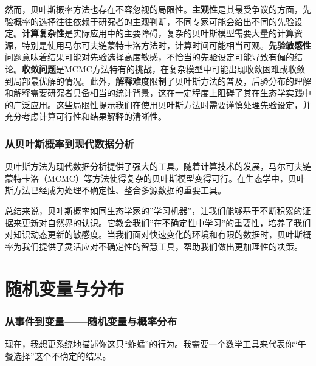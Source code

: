 \documentclass[
]{book}
\begin{document}
然而，贝叶斯概率方法也存在不容忽视的局限性。\textbf{主观性}是其最受争议的方面，先验概率的选择往往依赖于研究者的主观判断，不同专家可能会给出不同的先验设定。\textbf{计算复杂性}是实际应用中的主要障碍，复杂的贝叶斯模型需要大量的计算资源，特别是使用马尔可夫链蒙特卡洛方法时，计算时间可能相当可观。\textbf{先验敏感性}问题意味着结果可能对先验选择高度敏感，不恰当的先验设定可能导致有偏的结论。\textbf{收敛问题}是MCMC方法特有的挑战，在复杂模型中可能出现收敛困难或收敛到局部最优解的情况。此外，\textbf{解释难度}限制了贝叶斯方法的普及，后验分布的理解和解释需要研究者具备相当的统计背景，这在一定程度上阻碍了其在生态学实践中的广泛应用。这些局限性提示我们在使用贝叶斯方法时需要谨慎处理先验设定，并充分考虑计算可行性和结果解释的清晰性。

\hypertarget{ux4eceux8d1dux53f6ux65afux6982ux7387ux5230ux73b0ux4ee3ux6570ux636eux5206ux6790}{%
\subsubsection{从贝叶斯概率到现代数据分析}\label{ux4eceux8d1dux53f6ux65afux6982ux7387ux5230ux73b0ux4ee3ux6570ux636eux5206ux6790}}

贝叶斯方法为现代数据分析提供了强大的工具。随着计算技术的发展，马尔可夫链蒙特卡洛（MCMC）等方法使得复杂的贝叶斯模型变得可行。在生态学中，贝叶斯方法已经成为处理不确定性、整合多源数据的重要工具。

总结来说，贝叶斯概率如同生态学家的''学习机器''，让我们能够基于不断积累的证据来更新对自然界的认识。它教会我们''在不确定性中学习''的重要性，培养了我们对知识动态更新的敏感度。当我们面对快速变化的环境和有限的数据时，贝叶斯概率为我们提供了灵活应对不确定性的智慧工具，帮助我们做出更加理性的决策。

\hypertarget{ux968fux673aux53d8ux91cfux4e0eux5206ux5e03}{%
\section{随机变量与分布}\label{ux968fux673aux53d8ux91cfux4e0eux5206ux5e03}}

\hypertarget{ux4eceux4e8bux4ef6ux5230ux53d8ux91cfux968fux673aux53d8ux91cfux4e0eux6982ux7387ux5206ux5e03}{%
\subsubsection{从事件到变量------随机变量与概率分布}\label{ux4eceux4e8bux4ef6ux5230ux53d8ux91cfux968fux673aux53d8ux91cfux4e0eux6982ux7387ux5206ux5e03}}

现在，我想更系统地描述你这只``蚱蜢''的行为。我需要一个数学工具来代表你``午餐选择''这个不确定的结果。
\end{document}
